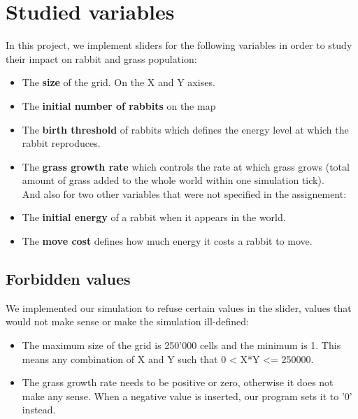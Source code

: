 \documentclass[fontsize=11pt]{scrartcl} %
\begin{document}
\section*{Studied variables}

In this project, we implement sliders for the following variables in order to study their impact on rabbit and grass population:

\begin{itemize}

\item The \textbf{size} of the grid. On the X and Y axises.

\item The \textbf{initial number of rabbits} on the map

\item The \textbf{birth threshold} of rabbits which defines the energy level at which the rabbit reproduces.

\item The \textbf{grass growth rate} which controls the rate at which grass grows (total amount of grass added to the whole world within one simulation tick). \\

And also for two other variables that were not specified in the assignement:

\item The \textbf{initial energy} of a rabbit when it appears in the world.

\item The \textbf{move cost} defines how much energy it costs a rabbit to move.

\end{itemize}


\subsection*{Forbidden values}

We implemented our simulation to refuse certain values in the slider, values that would not make sense or make the simulation ill-defined:

\begin{itemize}

\item The maximum size of the grid is 250'000 cells and the minimum is 1. This means any combination of X and Y such that 0 < X*Y <= 250000.

\item The grass growth rate needs to be positive or zero, otherwise it does not make any sense. When a negative value is inserted, our program sets it to '0' instead.

\end{itemize}
\end{document}
